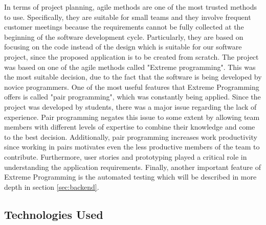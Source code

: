 \documentclass{l3proj}
\begin{document}
In terms of project planning, agile methods are one of the most trusted methods to use. Specifically, they are suitable for small teams and they involve frequent customer meetings because the requirements cannot be fully collected at the beginning of the software development cycle. Particularly, they are based on focusing on the code instead of the design which is suitable for our software project, since the proposed application is to be created from scratch. The project was based on one of the agile methods called "Extreme programming". This was the most suitable decision, due to the fact that the software is being developed by novice programmers. One of the most useful features that Extreme Programming offers is called "pair programming", which was constantly being applied. Since the project was developed by students, there was a major issue regarding the lack of experience. Pair programming negates this issue to some extent by allowing team members with different levels of expertise to combine their knowledge and come to the best decision. Additionally, pair programming increases work productivity since working in pairs motivates even the less productive members of the team to contribute. Furthermore, user stories and prototyping played a critical role in understanding the application requirements. Finally, another important feature of Extreme Programming is the automated testing which will be described in more depth in section \ref{sec:backend}.

\subsection{Technologies Used}
\label{tech}
\end{document}
